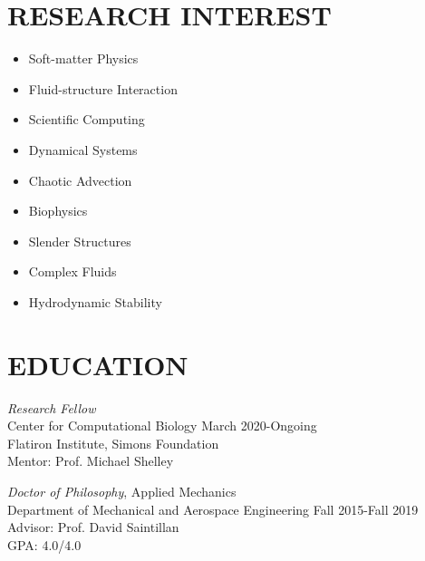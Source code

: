 \documentclass[10pt]{res} %
\begin{document}
\begin{resume}


\section{{RESEARCH INTEREST}}

\vspace{8pt} %

\begin{multicols}{3}
    \begin{itemize}
    	\item[] Soft-matter Physics
    	\item[] Fluid-structure Interaction
    	\item[] Scientific Computing
    	\item[] Dynamical Systems
    	\item[] Chaotic Advection
    	\item[] Biophysics
    	\item[] Slender Structures
    	\item[] Complex Fluids
    	\item[] Hydrodynamic Stability
    \end{itemize}
\end{multicols}


\section{{EDUCATION}} 

\vspace{8pt} %
{\sl Research Fellow} \\
Center for Computational Biology  \hfill March 2020-Ongoing \\
Flatiron Institute, Simons Foundation  \\
Mentor: Prof. Michael Shelley 

{\sl Doctor of Philosophy}, 
Applied Mechanics \\ 
Department of Mechanical and Aerospace Engineering \hfill Fall 2015-Fall 2019 \\ 
Advisor: Prof. David Saintillan \\
GPA: 4.0/4.0
 

\end{resume}
\end{document}
